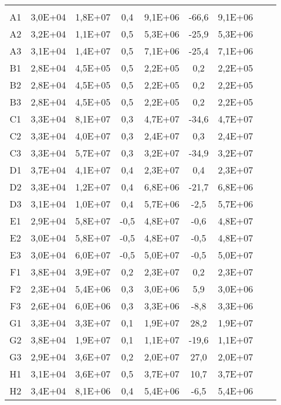\begin{center}
\begin{longtable}{ccccccccc}
\toprule
\endhead
\midrule \\ %
\endfoot
\bottomrule 
\endlastfoot
A1    & 3,0E+04 & 1,8E+07 & 0,4   & 9,1E+06 & -66,6 & 9,1E+06 \\
A2    & 3,2E+04 & 1,1E+07 & 0,5   & 5,3E+06 & -25,9 & 5,3E+06 \\
A3    & 3,1E+04 & 1,4E+07 & 0,5   & 7,1E+06 & -25,4 & 7,1E+06 \\
B1    & 2,8E+04 & 4,5E+05 & 0,5   & 2,2E+05 & 0,2   & 2,2E+05 \\
B2    & 2,8E+04 & 4,5E+05 & 0,5   & 2,2E+05 & 0,2   & 2,2E+05 \\
B3    & 2,8E+04 & 4,5E+05 & 0,5   & 2,2E+05 & 0,2   & 2,2E+05 \\
C1    & 3,3E+04 & 8,1E+07 & 0,3   & 4,7E+07 & -34,6 & 4,7E+07 \\
C2    & 3,3E+04 & 4,0E+07 & 0,3   & 2,4E+07 & 0,3   & 2,4E+07 \\
C3    & 3,3E+04 & 5,7E+07 & 0,3   & 3,2E+07 & -34,9 & 3,2E+07 \\
D1    & 3,7E+04 & 4,1E+07 & 0,4   & 2,3E+07 & 0,4   & 2,3E+07 \\
D2    & 3,3E+04 & 1,2E+07 & 0,4   & 6,8E+06 & -21,7 & 6,8E+06 \\
D3    & 3,1E+04 & 1,0E+07 & 0,4   & 5,7E+06 & -2,5  & 5,7E+06 \\
E1    & 2,9E+04 & 5,8E+07 & -0,5  & 4,8E+07 & -0,6  & 4,8E+07 \\
E2    & 3,0E+04 & 5,8E+07 & -0,5  & 4,8E+07 & -0,5  & 4,8E+07 \\
E3    & 3,0E+04 & 6,0E+07 & -0,5  & 5,0E+07 & -0,5  & 5,0E+07 \\
F1    & 3,8E+04 & 3,9E+07 & 0,2   & 2,3E+07 & 0,2   & 2,3E+07 \\
F2    & 2,3E+04 & 5,4E+06 & 0,3   & 3,0E+06 & 5,9   & 3,0E+06 \\
F3    & 2,6E+04 & 6,0E+06 & 0,3   & 3,3E+06 & -8,8  & 3,3E+06 \\
G1    & 3,3E+04 & 3,3E+07 & 0,1   & 1,9E+07 & 28,2  & 1,9E+07 \\
G2    & 3,8E+04 & 1,9E+07 & 0,1   & 1,1E+07 & -19,6 & 1,1E+07 \\
G3    & 2,9E+04 & 3,6E+07 & 0,2   & 2,0E+07 & 27,0  & 2,0E+07 \\
H1    & 3,1E+04 & 3,6E+07 & 0,5   & 3,7E+07 & 10,7  & 3,7E+07 \\
H2    & 3,4E+04 & 8,1E+06 & 0,4   & 5,4E+06 & -6,5  & 5,4E+06 \\

\end{longtable}
\end{center}
